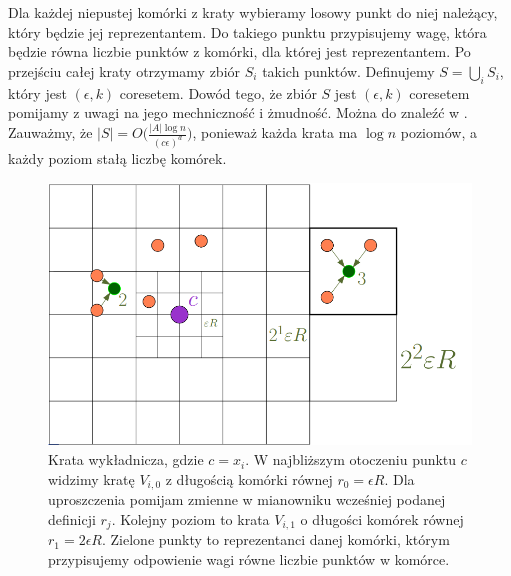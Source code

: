Dla każdej niepustej komórki z kraty wybieramy losowy punkt do niej należący, który będzie jej reprezentantem.
Do takiego punktu przypisujemy wagę, która będzie równa liczbie punktów z komórki, dla której jest reprezentantem.
Po przejściu całej kraty otrzymamy zbiór $S_{i}$ takich punktów.
Definujemy $S = \bigcup_{i} S_{i}$, który jest  $(\epsilon, k)$ coresetem.
Dowód tego, że zbiór $S$ jest $(\epsilon, k)$ coresetem pomijamy z uwagi na jego mechniczność i żmudność.
Można do znaleźć w \cite{10.1145/1007352.1007400}.
Zauważmy, że $|S| = O\Big( \frac{|A| \log n }{ (c\epsilon)^{d} } \Big)$, ponieważ każda krata ma $\log n$ poziomów, a każdy poziom stałą liczbę komórek.
\begin{figure}[H]
    \centering
    \includegraphics[totalheight=4cm]{grid.png}
    \caption{Krata wykładnicza, gdzie $c = x_{i}$. W najbliższym otoczeniu punktu $c$ widzimy kratę $V_{i,0}$ z długością komórki równej $r_{0} = \epsilon R$.
    Dla uproszczenia pomijam zmienne w mianowniku wcześniej podanej definicji $r_{j}$.
    Kolejny poziom to krata $V_{i,1}$ o długości komórek równej $r_{1} = 2 \epsilon R$.
    Zielone punkty to reprezentanci danej komórki, którym przypisujemy odpowienie wagi równe liczbie punktów w komórce. 
    }
\end{figure}
